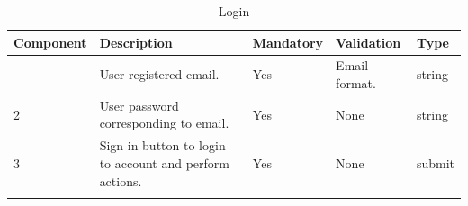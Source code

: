 \documentclass[12pt]{article}
\begin{document}
\newpage
\begin{longtable}{|>{\raggedright\arraybackslash}p{2.5cm}|>{\raggedright\arraybackslash}p{2.5cm}|>{\raggedright\arraybackslash}p{2.5cm}|>{\raggedright\arraybackslash}p{2cm}|>{\raggedright\arraybackslash}p{2cm}|}
\hline
\textbf{Component} & \textbf{Description} & \textbf{Mandatory} & \textbf{Validation} & \textbf{Type}\\
\hline
1 &
User registered email. &
Yes &
Email format. &
string \\
\hline

2 &
User password corresponding to email. &
Yes &
None &
string \\
\hline

3 &
Sign in button to login to account and perform actions. &
Yes &
None &
submit \\
\hline

\caption{Login}
\end{longtable}


\end{document}
